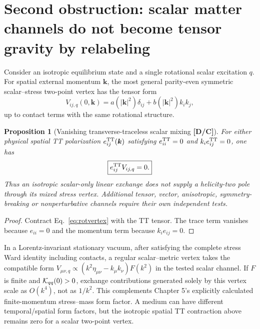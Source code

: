 \documentclass[11pt,a4paper]{article}
\newtheorem{proposition}{Proposition}[section]\newtheorem{lemma}[proposition]{Lemma}\newtheorem{definition}[proposition]{Definition}\newtheorem{remark}[proposition]{Remark}
\begin{document}
\section{Second obstruction: scalar matter channels do not become tensor gravity by relabeling}
Consider an isotropic equilibrium state and a single rotational scalar excitation $q$. For spatial external momentum $\bm k$, the most general parity-even symmetric scalar--stress two-point vertex has the tensor form
\begin{equation}\label{eq:rotvertex}
V_{ij,q}(0,\bm k)=a(|\bm k|^2)\delta_{ij}+b(|\bm k|^2)k_i k_j,
\end{equation}
up to contact terms with the same rotational structure.
\begin{proposition}[Vanishing transverse-traceless scalar mixing \textbf{[D/C]}]\label{prop:TT}
For either physical spatial TT polarization $e_{ij}^{\rm TT}(\bm k)$ satisfying $e_{ii}^{\rm TT}=0$ and $k_ie_{ij}^{\rm TT}=0$, one has
\begin{equation}\label{eq:TTzero}
\boxed{e_{ij}^{\rm TT}V_{ij,q}=0.}
\end{equation}
Thus an isotropic scalar-only linear exchange does not supply a helicity-two pole through its mixed stress vertex. Additional tensor, vector, anisotropic, symmetry-breaking or nonperturbative channels require their own independent tests.
\end{proposition}
\begin{proof}
Contract Eq.~\eqref{eq:rotvertex} with the TT tensor. The trace term vanishes because $e_{ii}=0$ and the momentum term because $k_ie_{ij}=0$.
\end{proof}
In a Lorentz-invariant stationary vacuum, after satisfying the complete stress Ward identity including contacts, a regular scalar--metric vertex takes the compatible form $V_{\mu\nu,q}\propto(k^2\eta_{\mu\nu}-k_\mu k_\nu)F(k^2)$ in the tested scalar channel. If $F$ is finite and $\mathcal K_{qq}(0)>0$, exchange contributions generated solely by this vertex scale as $O(k^4)$, not as $1/k^2$. This complements Chapter 5's explicitly calculated finite-momentum stress--mass form factor. A medium can have different temporal/spatial form factors, but the isotropic spatial TT contraction above remains zero for a scalar two-point vertex.
\end{document}
